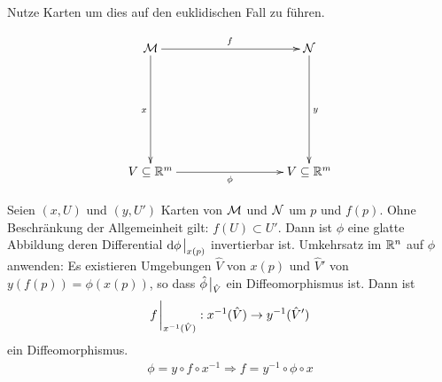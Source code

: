 \begin{bew} \leavevmode
Nutze Karten um dies auf den euklidischen Fall zu führen.

\begin{align}
\begin{xy}
  \xymatrix@=0.25\linewidth{
      \mfk \ar[r]^f \ar[d]_x    &   \mfka \ar[d]^y \\
      V\subseteq \R^m \ar[r]_\phi             &   V\subseteq \R^m    
  }
\end{xy}
\end{align}

Seien $(x, U)$ und $(y, U')$ Karten von $\mathcal{M}$ und $\mathcal{N}$ um $p$ und $f(p)$.
Ohne Beschränkung der Allgemeinheit gilt: $f(U) \subset U'$.
Dann ist $\phi$ eine glatte Abbildung deren Differential $\dd \phi \eval_{x(p)}$ invertierbar ist.
Umkehrsatz im $\mathbb{R}^n$ auf $\phi$ anwenden:
Es existieren Umgebungen $\hat{V}$ von $x(p)$ und $\hat{V}'$ von $y(f(p)) = \phi(x(p))$, so dass
$\hat{\phi}\eval_{\hat{V}}$ ein Diffeomorphismus ist.
Dann ist
\begin{align}
f\eval_{x^{-1}(\hat{V})}: x^{-1}(\hat{V}) \to y^{-1}(\hat{V}')
\end{align}
ein Diffeomorphismus.
\begin{align}
\phi = y \circ f \circ x^{-1} \Rightarrow f = y^{-1} \circ \phi \circ x
\end{align}
\end{bew}


